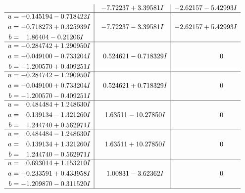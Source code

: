\documentclass[1p]{elsarticle_modified}
\theoremstyle{definition}
\begin{document}
$$\begin{array}{c|c|c}
 & -7.72237 + 3.39581 I & -2.62157 - 5.42993 I \\ \hline\begin{aligned}
u &= -0.145194 - 0.718422 I \\
a &= -0.718273 + 0.325939 I \\
b &= \phantom{-}1.86404 - 0.21206 I\end{aligned}
 & -7.72237 - 3.39581 I & -2.62157 + 5.42993 I \\ \hline\begin{aligned}
u &= -0.284742 + 1.290950 I \\
a &= -0.049100 - 0.733204 I \\
b &= -1.200570 + 0.409251 I\end{aligned}
 & \phantom{-}0.524621 - 0.718329 I & \phantom{-0.000000 } 0 \\ \hline\begin{aligned}
u &= -0.284742 - 1.290950 I \\
a &= -0.049100 + 0.733204 I \\
b &= -1.200570 - 0.409251 I\end{aligned}
 & \phantom{-}0.524621 + 0.718329 I & \phantom{-0.000000 } 0 \\ \hline\begin{aligned}
u &= \phantom{-}0.484484 + 1.248630 I \\
a &= \phantom{-}0.139134 - 1.321260 I \\
b &= \phantom{-}1.244740 + 0.562971 I\end{aligned}
 & \phantom{-}1.63511 - 10.27850 I & \phantom{-0.000000 } 0 \\ \hline\begin{aligned}
u &= \phantom{-}0.484484 - 1.248630 I \\
a &= \phantom{-}0.139134 + 1.321260 I \\
b &= \phantom{-}1.244740 - 0.562971 I\end{aligned}
 & \phantom{-}1.63511 + 10.27850 I & \phantom{-0.000000 } 0 \\ \hline\begin{aligned}
u &= \phantom{-}0.693014 + 1.153210 I \\
a &= -0.233591 + 0.433958 I \\
b &= -1.209870 - 0.311520 I\end{aligned}
 & \phantom{-}1.00831 - 3.62362 I & \phantom{-0.000000 } 0\\
 \hline 
 \end{array}$$\newpage$$\begin{array}{c|c|c}  

\end{array}$$
\end{document}
